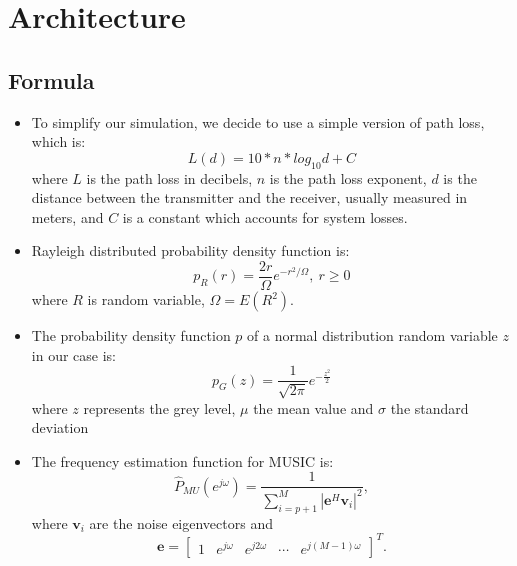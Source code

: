 \section{Architecture}
\subsection{Formula}
\begin{itemize}
\item To simplify our simulation, we decide to use a simple version of path loss, which is:
\begin{equation}
L(d)=10*n*log_{10}d + C
\end{equation}
where $L$ is the path loss in decibels, $n$ is the path loss exponent, $d$ is the distance between the transmitter and the receiver, usually measured in meters, and $C$ is a constant which accounts for system losses.
\vspace{1cm}

\item Rayleigh distributed probability density function is:
\begin{equation}
p_{R}(r)={\frac {2r}{\Omega }}e^{-r^{2}/\Omega },\ r\geq {}0
\end{equation}
where $R$ is random variable, $\Omega = E(R^{2})$.
\vspace{1cm}

\item The probability density function $p$ of a normal distribution random variable $z$ in our case is:
\begin{equation}
p_{G}(z)={\frac {1}{ {\sqrt {2\pi }}}}e^{-{\frac {z^{2}}{2}}}
\end{equation}
where $z$ represents the grey level, $\mu$  the mean value and $\sigma$  the standard deviation
\vspace{1cm}
\par
\item The frequency estimation function for MUSIC is:
\begin{equation}
\hat P_{MU}(e^{j \omega}) = \frac{1}{\sum_{i=p+1}^{M} |\mathbf{e}^{H} \mathbf{v}_i|^2},
\end{equation}
where $\mathbf{v}_i$ are the noise eigenvectors and
\begin{equation}
\mathbf{e} = \begin{bmatrix}1 & e^{j \omega} & e^{j 2 \omega} & \cdots & e^{j (M-1) \omega}\end{bmatrix}^T.
\end{equation}
\end{itemize}

